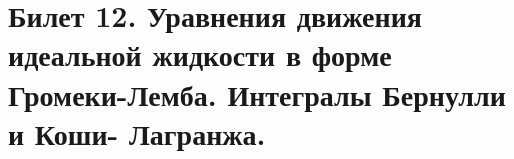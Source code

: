 \newpage
\section{Билет 12. Уравнения движения идеальной жидкости в форме Громеки-Лемба. Интегралы Бернулли и Коши- Лагранжа.}
